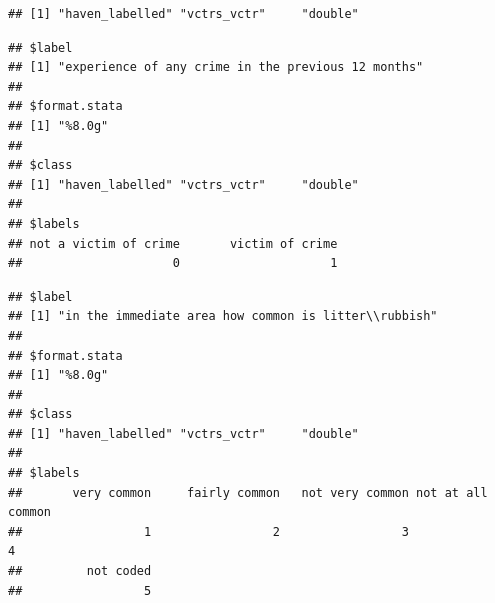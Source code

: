 \documentclass[
]{book}
\newenvironment{Shaded}{\begin{snugshade}}{\end{snugshade}}
\newcommand{\CommentTok}[1]{\textcolor[rgb]{0.56,0.35,0.01}{\textit{#1}}}
\newcommand{\FunctionTok}[1]{\textcolor[rgb]{0.00,0.00,0.00}{#1}}
\newcommand{\NormalTok}[1]{#1}
\newcommand{\OtherTok}[1]{\textcolor[rgb]{0.56,0.35,0.01}{#1}}
\newcommand{\SpecialCharTok}[1]{\textcolor[rgb]{0.00,0.00,0.00}{#1}}
\begin{document}
\begin{verbatim}
## [1] "haven_labelled" "vctrs_vctr"     "double"
\end{verbatim}

\begin{Shaded}
\end{Shaded}

\begin{verbatim}
## $label
## [1] "experience of any crime in the previous 12 months"
## 
## $format.stata
## [1] "%8.0g"
## 
## $class
## [1] "haven_labelled" "vctrs_vctr"     "double"        
## 
## $labels
## not a victim of crime       victim of crime 
##                     0                     1
\end{verbatim}

\begin{Shaded}
\end{Shaded}

\begin{verbatim}
## $label
## [1] "in the immediate area how common is litter\\rubbish"
## 
## $format.stata
## [1] "%8.0g"
## 
## $class
## [1] "haven_labelled" "vctrs_vctr"     "double"        
## 
## $labels
##       very common     fairly common   not very common not at all common 
##                 1                 2                 3                 4 
##         not coded 
##                 5
\end{verbatim}

\begin{Shaded}
\end{Shaded}
\end{document}
